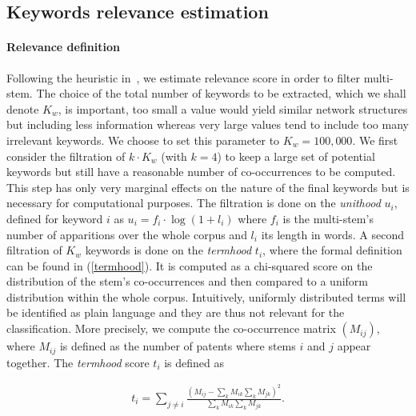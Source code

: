 \documentclass[article]{article}%
\begin{document}
\subsection{Keywords relevance estimation}
\label{keywords_est}
\paragraph{Relevance definition}

Following the heuristic in~\citet{chavalarias2013phylomemetic}, we estimate relevance score in order to filter multi-stem. The choice of the total number of keywords to be extracted, which we shall denote $K_w$, is important, too small a value would yield similar network structures but including less information whereas very large values tend to include too many irrelevant keywords. We choose to set this parameter to $K_w = 100,000$. We first consider the filtration of $k\cdot K_w$ (with $k=4$) to keep a large set of potential keywords but still have a reasonable number of co-occurrences to be computed. This step has only very marginal effects on the nature of the final keywords but is necessary for computational purposes. The filtration is done on the \emph{unithood} $u_i$, defined for keyword $i$ as $u_i = f_i\cdot \log{(1 + l_i)}$ where $f_i$ is the multi-stem's number of apparitions over the whole corpus and $l_i$ its length in words. A second filtration of $K_w$ keywords is done on the \emph{termhood} $t_i$, where the formal definition can be found in (\ref{termhood}). It is computed as a chi-squared score on the distribution of the stem's co-occurrences and then compared to a uniform distribution within the whole corpus. Intuitively, uniformly distributed terms will be identified as plain language and they are thus not relevant for the classification. More precisely, we compute the co-occurrence matrix $(M_{ij})$, where $M_{ij}$ is defined as the number of patents where stems $i$ and $j$ appear together. The \emph{termhood} score $t_i$ is defined as

\begin{eqnarray}
\label{termhood}
t_i = \sum_{j\neq i}\frac{\left( M_{ij} - \sum_{k}M_{ik} \sum_{k} M_{jk}\right)^2}{\sum_{k}M_{ik} \sum_{k} M_{jk}}.
\end{eqnarray}
\end{document}
